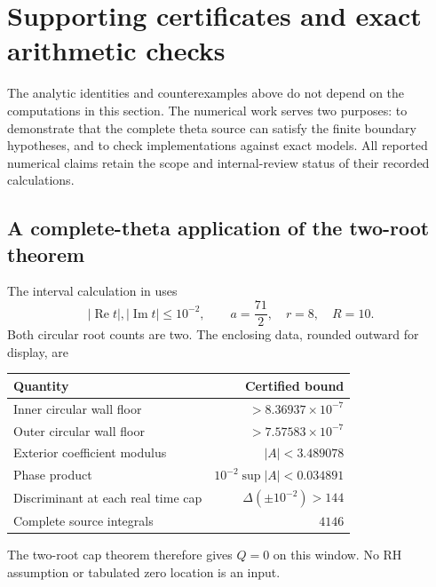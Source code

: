 \section{Supporting certificates and exact arithmetic checks}
\label{sec:support}

The analytic identities and counterexamples above do not depend on the
computations in this section. The numerical work serves two purposes:
to demonstrate that the complete theta source can satisfy the finite
boundary hypotheses, and to check implementations against exact models.
All reported numerical claims retain the scope and internal-review
status of their recorded calculations.

\subsection{A complete-theta application of the two-root theorem}

The interval calculation in \cite{note06,realcap} uses
\begin{equation}
 |\operatorname{Re}t|,|\operatorname{Im}t|\leq10^{-2},\qquad
 a=\frac{71}{2},\quad r=8,\quad R=10.
 \label{n:window}
\end{equation}
Both circular root counts are two. The enclosing data, rounded
outward for display, are
\begin{center}
\begin{tabular}{@{}lr@{}}
\toprule
Quantity & Certified bound\\
\midrule
Inner circular wall floor & $>8.36937\times10^{-7}$\\
Outer circular wall floor & $>7.57583\times10^{-7}$\\
Exterior coefficient modulus & $|A|<3.489078$\\
Phase product & $10^{-2}\sup|A|<0.034891$\\
Discriminant at each real time cap & $\Delta(\pm10^{-2})>144$\\
Complete source integrals & $4146$\\
\bottomrule
\end{tabular}
\end{center}
The two-root cap theorem therefore gives $Q=0$ on this window.
No RH assumption or tabulated zero location is an input.

